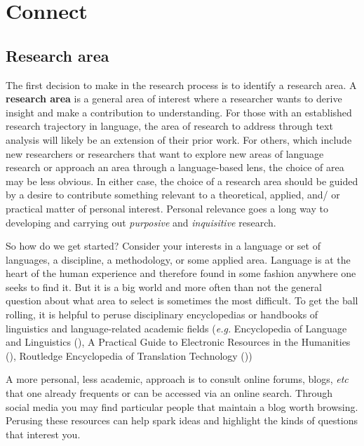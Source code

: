 \documentclass[
  letterpaper,
  krantz1]{latex/krantz-mod}
\theoremstyle{definition}
\theoremstyle{definition}
\theoremstyle{remark}
\begin{document}
\section{Connect}\label{sec-research-connect}

\subsection{Research area}\label{research-area}

The first decision to make in the research process is to identify a
research area. A \textbf{research area} is a
general area of interest where a researcher wants to derive insight and
make a contribution to understanding. For those with an established
research trajectory in language, the area of research to address through
text analysis will likely be an extension of their prior work. For
others, which include new researchers or researchers that want to
explore new areas of language research or approach an area through a
language-based lens, the choice of area may be less obvious. In either
case, the choice of a research area should be guided by a desire to
contribute something relevant to a theoretical, applied, and/ or
practical matter of personal interest. Personal relevance goes a long
way to developing and carrying out \emph{purposive} and
\emph{inquisitive} research.

So how do we get started? Consider your interests in a language or set
of languages, a discipline, a methodology, or some applied area.
Language is at the heart of the human experience and therefore found in
some fashion anywhere one seeks to find it. But it is a big world and
more often than not the general question about what area to select is
sometimes the most difficult. To get the ball rolling, it is helpful to
peruse disciplinary encyclopedias or handbooks of linguistics and
language-related academic fields (\emph{e.g.} Encyclopedia of Language
and Linguistics (), A Practical
Guide to Electronic Resources in the Humanities
(), Routledge
Encyclopedia of Translation Technology ())

A more personal, less academic, approach is to consult online forums,
blogs, \emph{etc} that one already frequents or can be accessed via an
online search. Through social media you may find particular people that
maintain a blog worth browsing. Perusing these resources can help spark
ideas and highlight the kinds of questions that interest you.
\end{document}
